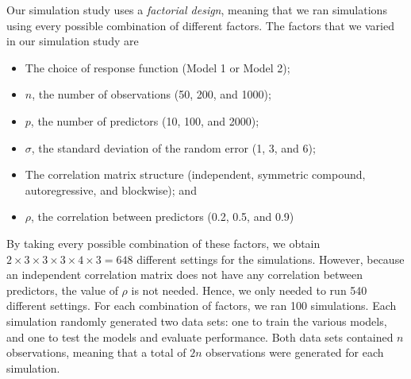 \documentclass[final,onefignum,onetabnum]{siuro210301}
\begin{document}

	
	Our simulation study uses a \textit{factorial design}, meaning that we ran simulations using every possible combination of different factors. The factors that we varied in our simulation study are
	\begin{itemize}\itemsep0pt
		\item The choice of response function (Model 1 or Model 2);
		\item $n$, the number of observations (50, 200, and 1000);
		\item $p$, the number of predictors (10, 100, and 2000);
		\item $\sigma$, the standard deviation of the random error (1, 3, and 6);
		\item The correlation matrix structure (independent, symmetric compound, autoregressive, and blockwise); and
		\item $\rho$, the correlation between predictors (0.2, 0.5, and 0.9)
	\end{itemize}
	
	By taking every possible combination of these factors, we obtain $2\times 3\times 3\times 3\times 4\times 3 = 648$ different settings for the simulations. However, because an independent correlation matrix does not have any correlation between predictors, the value of $\rho$ is not needed. Hence, we only needed to run 540 different settings. For each combination of factors, we ran 100 simulations. Each simulation randomly generated two data sets: one to train the various models, and one to test the models and evaluate performance. Both data sets contained $n$ observations, meaning that a total of $2n$ observations were generated for each simulation.
	
\end{document}
